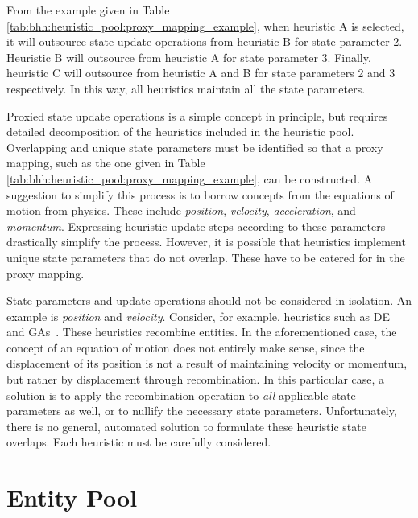 From the example given in Table \ref{tab:bhh:heuristic_pool:proxy_mapping_example}, when heuristic A is selected, it will outsource state update operations from heuristic B for state parameter 2. Heuristic B will outsource from heuristic A for state parameter 3. Finally, heuristic C will outsource from heuristic A and B for state parameters 2 and 3 respectively. In this way, all heuristics maintain all the state parameters.

Proxied state update operations is a simple concept in principle, but requires detailed decomposition of the heuristics included in the heuristic pool. Overlapping and unique state parameters must be identified so that a proxy mapping, such as the one given in Table \ref{tab:bhh:heuristic_pool:proxy_mapping_example}, can be constructed. A suggestion to simplify this process is to borrow concepts from the equations of motion from physics. These include \textit{position}, \textit{velocity}, \textit{acceleration}, and \textit{momentum}. Expressing heuristic update steps according to these parameters drastically simplify the process. However, it is possible that heuristics implement unique state parameters that do not overlap. These have to be catered for in the proxy mapping.

State parameters and update operations should not be considered in isolation. An example is \textit{position} and \textit{velocity}. Consider, for example, heuristics such as \acs{DE}~\cite{ref:price:2006} and \acp{GA}~\cite{ref:holland:1992}. These heuristics recombine entities. In the aforementioned case, the concept of an equation of motion does not entirely make sense, since the displacement of its position is not a result of maintaining velocity or momentum, but rather by displacement through recombination. In this particular case, a solution is to apply the recombination operation to \textit{all} applicable state parameters as well, or to nullify the necessary state parameters. Unfortunately, there is no general, automated solution to formulate these heuristic state overlaps. Each heuristic must be carefully considered.

\section{Entity Pool}\label{sec:bhh:entity_pool}

